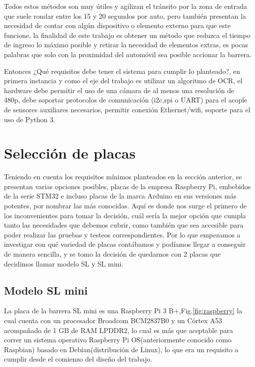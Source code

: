 Todos estos métodos son muy útiles y agilizan el tránsito por la zona de entrada que suele rondar entre los 15 y 20 segundos por
auto, pero también presentan la necesidad de contar con algún dispositivo o elemento externo para que este funcione, la finalidad
de este trabajo es obtener un método que reduzca el tiempo de ingreso lo máximo posible y retirar la necesidad de elementos
extras, es pocas palabras que solo con la proximidad del automóvil sea posible accionar la barrera.


Entonces ¿Qué requisitos debe tener el sistema para cumplir lo planteado?, en primera instancia y como el eje del trabajo
es utilizar un algoritmo de OCR, el hardware debe permitir el uso de una cámara de al menos una resolución de 480p, debe
soportar protocolos de comunicación (i2c,spi o UART) para el acople de sensores auxiliares necesarios, permitir conexión
Ethernet/wifi, soporte para el uso de Python 3.

\section{Selección de placas}
Teniendo en cuenta los requisitos mínimos planteados en la sección anterior, se presentan varias opciones posibles,
placas de la empresa Raspberry Pi, embebidos de la serie STM32 e incluso placas de la marca Arduino en sus versiones más
potentes, por nombrar las más conocidas. Aquí es donde nos surge el primero de los inconvenientes para tomar la decisión,
cuál sería la mejor opción que cumpla tanto las necesidades que debemos cubrir, como también que sea accesible para poder realizar las pruebas y testeos correspondientes.
Por lo que empezamos a investigar con qué variedad de placas contábamos y podíamos llegar a conseguir de manera sencilla,
y se tomo la decisión de quedarnos con 2 placas que decidimos llamar modelo SL y SL mini.

\subsection{Modelo SL mini}
La placa de la barrera SL mini es una Raspberry Pi 3 B+,Fig.\ref{fig:raspberry} la cual cuenta con un procesador
Broadcom BCM2837B0 y un Córtex A53 acompañado de 1 GB de RAM LPDDR2, lo cual es más que aceptable para correr un sistema operativo Raspberry Pi
OS(anteriormente conocido como Raspbian) basado en Debian(distribución de Linux), lo que era un requisito a cumplir desde
el comienzo del diseño del trabajo.

